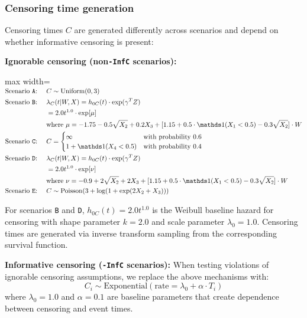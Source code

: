 \subsubsection{Censoring time generation}
Censoring times $C$ are generated differently across scenarios and depend on whether informative censoring is present:

\textbf{Ignorable censoring (non\texttt{-InfC} scenarios):}
\par\noindent\begin{adjustbox}{max width=\linewidth}$\displaystyle\begin{aligned}
\text{Scenario \texttt{A}: } \quad &C \sim \text{Uniform}(0, 3) \\
\text{Scenario \texttt{B}: } \quad &\lambda_C(t | W, X) = h_{0C}(t) \cdot \exp(\gamma^T Z) \\
&= 2.0t^{1.0} \cdot \exp[\mu] \\
&\text{where } \mu = -1.75 - 0.5\sqrt{X_{2}} + 0.2X_{3} + [1.15 + 0.5 \cdot \ChFourInd(X_{1} < 0.5) - 0.3\sqrt{X_{2}}] \cdot W \\
\text{Scenario \texttt{C}: } \quad &C = \begin{cases} 
\infty & \text{with probability } 0.6 \\
1 + \ChFourInd(X_{4} < 0.5) & \text{with probability } 0.4
\end{cases} \\
\text{Scenario \texttt{D}: } \quad &\lambda_C(t | W, X) = h_{0C}(t) \cdot \exp(\gamma^T Z) \\
&= 2.0t^{1.0} \cdot \exp[\nu] \\
&\text{where } \nu = -0.9 + 2\sqrt{X_{2}} + 2X_{3} + [1.15 + 0.5 \cdot \ChFourInd(X_{1} < 0.5) - 0.3\sqrt{X_{2}}] \cdot W \\
\text{Scenario \texttt{E}: } \quad &C \sim \text{Poisson}(3 + \log(1 + \exp(2X_{2} + X_{3})))
\end{aligned}$\end{adjustbox}\par
For scenarios \texttt{B} and \texttt{D}, $h_{0C}(t) = 2.0t^{1.0}$ is the Weibull baseline hazard for censoring with shape parameter $k=2.0$ and scale parameter $\lambda_0=1.0$.
Censoring times are generated via inverse transform sampling from the corresponding survival function.

\textbf{Informative censoring (\texttt{-InfC} scenarios):} When testing violations of ignorable censoring assumptions, we replace the above mechanisms with:
\begin{equation}
C_i \sim \text{Exponential}(\text{rate} = \lambda_0 + \alpha \cdot T_i)
\end{equation}
where $\lambda_0 = 1.0$ and $\alpha = 0.1$ are baseline parameters that create dependence between censoring and event times.

